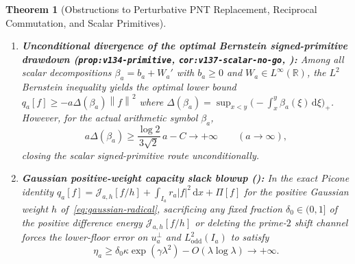 \documentclass[11pt]{article}
\newtheorem{theorem}{Theorem}[section]
\theoremstyle{remark}
\newcommand{\norm}[1]{\left\lVert #1\right\rVert}
\newcommand{\dd}{\mathrm d}
\begin{document}
\begin{theorem}[Obstructions to Perturbative PNT Replacement, Reciprocal Commutation, and Scalar Primitives]
\begin{enumerate}[label=(\alph*)]
\begin{equation}
    \liminf_{a \to \infty} \norm{1_{E_a}\Pi_{a,u}1_{F_a}} \ge \frac{73}{375\pi} > 0.0619.
  \end{equation}
  \item \textbf{Unconditional divergence of the optimal Bernstein signed-primitive drawdown (\texttt{prop:v134-primitive}, \texttt{cor:v137-scalar-no-go}, ):} Among all scalar decompositions $\beta_a = b_a + W_a'$ with $b_a \ge 0$ and $W_a \in L^\infty(\mathbb{R})$, the $L^2$ Bernstein inequality yields the optimal lower bound $q_a[f] \ge -a\Delta(\beta_a)\norm{f}^2$ where $\Delta(\beta_a) = \sup_{x<y}\bigl(-\int_x^y \beta_a(\xi)\,\dd\xi\bigr)_+$. However, for the actual arithmetic symbol $\beta_a$,
  \begin{equation}\label{eq:drawdown-divergence}
    a\Delta(\beta_a) \ge \frac{\log 2}{3\sqrt{2}}\,a - C \longrightarrow +\infty \qquad (a \to \infty),
  \end{equation}
  closing the scalar signed-primitive route unconditionally.
  \item \textbf{Gaussian positive-weight capacity slack blowup ():} In the exact Picone identity $q_a[f] = \mathcal{J}_{a,h}[f/h] + \int_{I_a} r_a |f|^2\,\dd x + \Pi[f]$ for the positive Gaussian weight $h$ of~\eqref{eq:gaussian-radical}, sacrificing any fixed fraction $\delta_0 \in (0,1]$ of the positive difference energy $\mathcal{J}_{a,h}[f/h]$ or deleting the prime-$2$ shift channel forces the lower-floor error on $u_a^\perp$ and $L^2_{\mathrm{odd}}(I_a)$ to satisfy
  \begin{equation}
    \eta_a \ge \delta_0 \kappa \exp(\gamma\lambda^2) - O(\lambda\log\lambda) \longrightarrow +\infty.
  \end{equation}
\end{enumerate}
\end{theorem}
\end{document}
